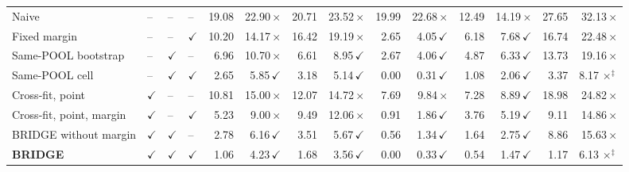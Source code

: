 \begin{table}[!t]
\begin{tabular}{@{}llllrrrrrrrrrr@{}}
\midrule
Naive & -- & -- & -- & 19.08 & 22.90\,$\times$ & 20.71 & 23.52\,$\times$ & 19.99 & 22.68\,$\times$ & 12.49 & 14.19\,$\times$ & 27.65 & 32.13\,$\times$ \\
Fixed margin & -- & -- & $\checkmark$ & 10.20 & 14.17\,$\times$ & 16.42 & 19.19\,$\times$ & 2.65 & 4.05\,$\checkmark$ & 6.18 & 7.68\,$\checkmark$ & 16.74 & 22.48\,$\times$ \\
Same-POOL bootstrap & -- & $\checkmark$ & -- & 6.96 & 10.70\,$\times$ & 6.61 & 8.95\,$\checkmark$ & 2.67 & 4.06\,$\checkmark$ & 4.87 & 6.33\,$\checkmark$ & 13.73 & 19.16\,$\times$ \\
Same-POOL cell & -- & $\checkmark$ & $\checkmark$ & 2.65 & 5.85\,$\checkmark$ & 3.18 & 5.14\,$\checkmark$ & 0.00 & 0.31\,$\checkmark$ & 1.08 & 2.06\,$\checkmark$ & 3.37 & 8.17\,$\times^{\ddagger}$ \\
Cross-fit, point & $\checkmark$ & -- & -- & 10.81 & 15.00\,$\times$ & 12.07 & 14.72\,$\times$ & 7.69 & 9.84\,$\times$ & 7.28 & 8.89\,$\checkmark$ & 18.98 & 24.82\,$\times$ \\
Cross-fit, point, margin & $\checkmark$ & -- & $\checkmark$ & 5.23 & 9.00\,$\times$ & 9.49 & 12.06\,$\times$ & 0.91 & 1.86\,$\checkmark$ & 3.76 & 5.19\,$\checkmark$ & 9.11 & 14.86\,$\times$ \\
BRIDGE without margin & $\checkmark$ & $\checkmark$ & -- & 2.78 & 6.16\,$\checkmark$ & 3.51 & 5.67\,$\checkmark$ & 0.56 & 1.34\,$\checkmark$ & 1.64 & 2.75\,$\checkmark$ & 8.86 & 15.63\,$\times$ \\
\textbf{BRIDGE} & $\checkmark$ & $\checkmark$ & $\checkmark$ & 1.06 & 4.23\,$\checkmark$ & 1.68 & 3.56\,$\checkmark$ & 0.00 & 0.33\,$\checkmark$ & 0.54 & 1.47\,$\checkmark$ & 1.17 & 6.13\,$\times^{\ddagger}$ \\
\bottomrule
\end{tabular}


\end{table}
